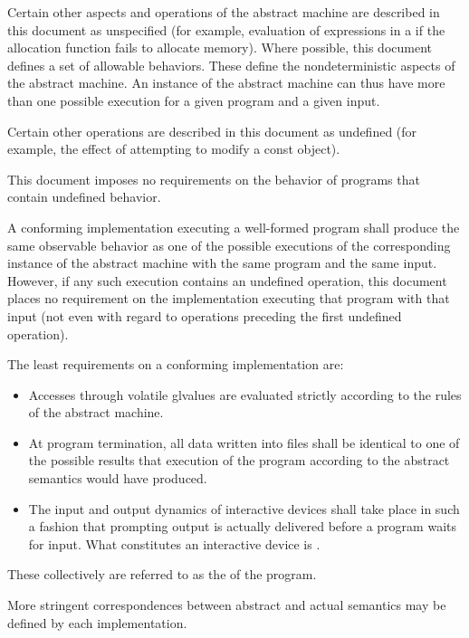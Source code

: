 %
\pnum
Certain other aspects and operations of the abstract machine are
described in this document as unspecified (for example,
evaluation of expressions in a  if the allocation
function fails to allocate memory). Where possible, this
document defines a set of allowable behaviors. These
define the nondeterministic aspects of the abstract machine. An instance
of the abstract machine can thus have more than one possible execution
for a given program and a given input.

%
\pnum
Certain other operations are described in this document as
undefined (for example, the effect of
attempting to modify a const object).
\begin{note} This document imposes no requirements on the
behavior of programs that contain undefined behavior. \end{note}

%
%
\pnum
A conforming implementation executing a well-formed program shall
produce the same observable behavior as one of the possible executions
of the corresponding instance of the abstract machine with the
same program and the same input.
%
However, if any such execution contains an undefined operation, this document places no
requirement on the implementation executing that program with that input
(not even with regard to operations preceding the first undefined
operation).

\pnum
The least requirements on a conforming implementation are:
\begin{itemize}
\item
Accesses through volatile glvalues are evaluated strictly according to the
rules of the abstract machine.
\item
At program termination, all data written into files shall be
identical to one of the possible results that execution of the program
according to the abstract semantics would have produced.
\item
The input and output dynamics of interactive devices shall take
place in such a fashion that prompting output is actually delivered before a program waits for input. What constitutes an interactive device is
.
\end{itemize}

These collectively are referred to as the
 of the program.
\begin{note} More stringent correspondences between abstract and actual
semantics may be defined by each implementation. \end{note}

